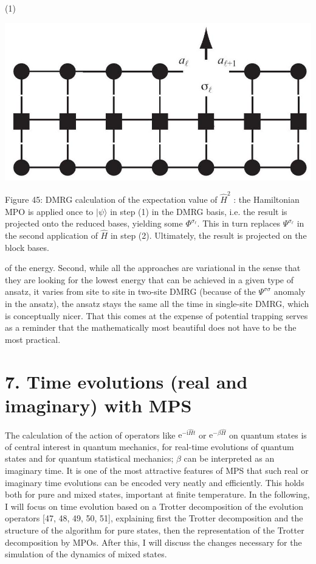 \documentclass[12pt]{article}
\begin{document}
(1)

\begin{center}
\includegraphics[max width=\textwidth]{2024_05_04_afc4ad226da9ccfe0ac8g-075}
\end{center}

Figure 45: DMRG calculation of the expectation value of $\hat{H}^{2}$ : the Hamiltonian MPO is applied once to $|\psi\rangle$ in step (1) in the DMRG basis, i.e. the result is projected onto the reduced bases, yielding some $\Phi^{\sigma_{\ell}}$. This in turn replaces $\Psi^{\sigma_{\ell}}$ in the second application of $\hat{H}$ in step (2). Ultimately, the result is projected on the block bases.

of the energy. Second, while all the approaches are variational in the sense that they are looking for the lowest energy that can be achieved in a given type of ansatz, it varies from site to site in two-site DMRG (because of the $\Psi^{\sigma \sigma}$ anomaly in the ansatz), the ansatz stays the same all the time in single-site DMRG, which is conceptually nicer. That this comes at the expense of potential trapping serves as a reminder that the mathematically most beautiful does not have to be the most practical.

\section*{7. Time evolutions (real and imaginary) with MPS}
The calculation of the action of operators like $\mathrm{e}^{-\mathrm{i} \hat{H} t}$ or $\mathrm{e}^{-\beta \hat{H}}$ on quantum states is of central interest in quantum mechanics, for real-time evolutions of quantum states and for quantum statistical mechanics; $\beta$ can be interpreted as an imaginary time. It is one of the most attractive features of MPS that such real or imaginary time evolutions can be encoded very neatly and efficiently. This holds both for pure and mixed states, important at finite temperature. In the following, I will focus on time evolution based on a Trotter decomposition of the evolution operators [47, 48, 49, 50, 51], explaining first the Trotter decomposition and the structure of the algorithm for pure states, then the representation of the Trotter decomposition by MPOs. After this, I will discuss the changes necessary for the simulation of the dynamics of mixed states.
\end{document}
